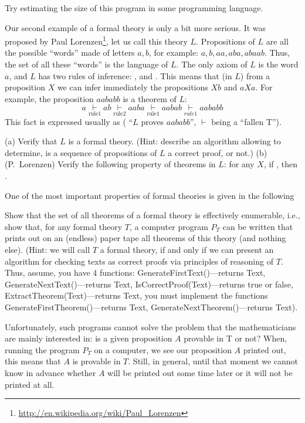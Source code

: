 \begin{exercise}
Try estimating the size of this program in some programming language.
\end{exercise}

Our second example of a formal theory is only a bit more serious.
It was proposed by Paul Lorenzen\footnote{\url{http://en.wikipedia.org/wiki/Paul\_Lorenzen}}, let us call this theory \(L\).
Propositions of \(L\) are all the possible ``words'' made of letters \(a, b\), for example: \(a, b, aa, aba, abaab\).
Thus, the set of all these ``words'' is the language of \(L\).
The only axiom of \(L\) is the word \(a\), and \(L\) has two rules of inference: , and .
This means that (in \(L\)) from a proposition \(X\) we can infer immediately the propositions \(Xb\) and \(aXa\).
For example, the proposition \(aababb\) is a theorem of \(L\):
\[
a \underset{\text{rule1}}{\vdash} ab \underset{\text{rule2}}{\vdash} aaba \underset{\text{rule1}}{\vdash} aabab \underset{rule1}{\vdash} aababb
\]
This fact is expressed usually as  ( ``\(L\) proves \(aababb\)'', \(\vdash\) being a ``fallen T'').

\begin{exercise}
(a) Verify that \(L\) is a formal theory.
(Hint: describe an algorithm allowing to determine, is a sequence of propositions of \(L\) a correct proof, or not.)
(b) (P.~Lorenzen) Verify the following property of theorems in \(L\): for any \(X\), if , then .
\end{exercise}

One of the most important properties of formal theories is given in the following

\begin{exercise}
Show that the set of all theorems of a formal theory is effectively enumerable, i.e., show that, for any formal theory \(T\), a computer program \(P_T\) can be written that prints out on an (endless) paper tape all theorems of this theory (and nothing else).
(Hint: we will call \(T\) a formal theory, if and only if we can present an algorithm for checking texts as correct proofs via principles of reasoning of \(T\).
Thus, assume, you have 4 functions: GenerateFirstText()---returns Text, GenerateNextText()---returns Text, IsCorrectProof(Text)---returns true or false, ExtractTheorem(Text)---returns Text, you must implement the functions GenerateFirstTheorem()---returns Text, GenerateNextTheorem()---returns Text).

Unfortunately, such programs cannot solve the problem that the mathematicians are mainly interested in: is a given proposition \(A\) provable in T or not? When, running the program \(P_T\) on a computer, we see our proposition \(A\) printed out, this means that \(A\) is provable in \(T\).
Still, in general, until that moment we cannot know in advance whether \(A\) will be printed out some time later or it will not be printed at all.
\end{exercise}

